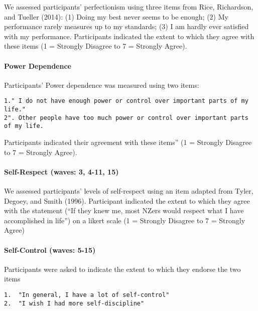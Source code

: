 \documentclass[
  letterpaper,
  DIV=11,
  numbers=noendperiod]{scrartcl}
\let\oldparagraph\paragraph
\renewcommand{\paragraph}[1]{\oldparagraph{#1}\mbox{}}
\begin{document}
We assessed participants' perfectionism using three items from Rice,
Richardson, and Tueller (2014): (1) Doing my best never seems to be
enough; (2) My performance rarely measures up to my standards; (3) I am
hardly ever satisfied with my performance. Participants indicated the
extent to which they agree with these items (1 = Strongly Disagree to 7
= Strongly Agree).

\hypertarget{power-dependence}{%
\paragraph{Power Dependence}\label{power-dependence}}

Participants' Power dependence was measured using two items:

\begin{verbatim}
1." I do not have enough power or control over important parts of my life."
2". Other people have too much power or control over important parts of my life. 
\end{verbatim}

Participants indicated their agreement with these items'' (1 = Strongly
Disagree to 7 = Strongly Agree).

\hypertarget{self-respect-waves-3-4-11-15}{%
\paragraph{Self-Respect (waves: 3, 4-11,
15)}\label{self-respect-waves-3-4-11-15}}

We assessed participants' levels of self-respect using an item adapted
from Tyler, Degoey, and Smith (1996). Participant indicated the extent
to which they agree with the statement (``If they knew me, most NZers
would respect what I have accomplished in life'') on a likert scale (1 =
Strongly Disagree to 7 = Strongly Agree)

\hypertarget{self-control-waves-5-15}{%
\paragraph{Self-Control (waves: 5-15)}\label{self-control-waves-5-15}}

Participants were asked to indicate the extent to which they endorse the
two items

\begin{verbatim}
1.  "In general, I have a lot of self-control"
2.  "I wish I had more self-discipline"
\end{verbatim}
\end{document}
